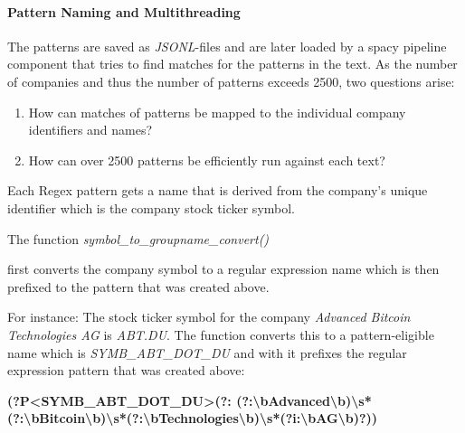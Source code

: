 \paragraph{Pattern Naming and Multithreading}
The patterns are saved as \emph{JSONL}-files and are later loaded by a spacy pipeline component that tries to find matches for the patterns in the text.
As the number of companies and thus the number of patterns exceeds 2500, two questions arise:

\begin{enumerate}
    \item How can matches of patterns be mapped to the individual company identifiers and names?
    \item How can over 2500 patterns be efficiently run against each text?
\end{enumerate}

Each \gls{Regex} pattern gets a name that is derived from the company’s unique identifier which is the company stock ticker symbol.


The function \emph{symbol\_to\_groupname\_convert()}
first converts the company symbol to a regular expression name which is then prefixed to the pattern that was created above.

For instance: The stock ticker symbol for the company \emph{Advanced Bitcoin Technologies AG} is \emph{ABT.DU}.
The function converts this to a pattern-eligible name which is \emph{SYMB\_ABT\_DOT\_DU} and with it prefixes the regular expression pattern that was created above:

\begin{center}                                                                                                                                                                                                                                                   
\footnotesize{\textbf{(?P\textless SYMB\_ABT\_DOT\_DU\textgreater (?: \break (?:\textbackslash bAdvanced\textbackslash b)\textbackslash s*(?:\textbackslash bBitcoin\textbackslash b)\textbackslash s*(?:\textbackslash bTechnologies\textbackslash b)\textbackslash s*(?i:\textbackslash bAG\textbackslash b)?))}}
\end{center}                                                                                                                                                                                                                                                     

